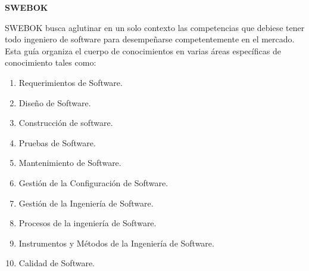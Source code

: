 \documentclass{report}
\begin{document}


\begin{center}\huge{}\textbf{SWEBOK}\end{center}
SWEBOK busca aglutinar en un solo contexto las competencias que debiese tener todo ingeniero de software para desempeñarse competentemente en el mercado. Esta guía organiza el cuerpo de conocimientos en varias áreas específicas de conocimiento tales como:
\begin{enumerate}
  \item {Requerimientos de Software.}
  \item {Diseño de Software.}
  \item {Construcción de software.}
  \item {Pruebas de Software.}
  \item {Mantenimiento de Software.}
  \item {Gestión de la Configuración de Software.}
  \item {Gestión de la Ingeniería de Software.}
  \item {Procesos de la ingeniería de Software.}
  \item {Instrumentos y Métodos de la Ingeniería de Software.}
  \item {Calidad de Software.\\}
\end{enumerate}
\end{document}
